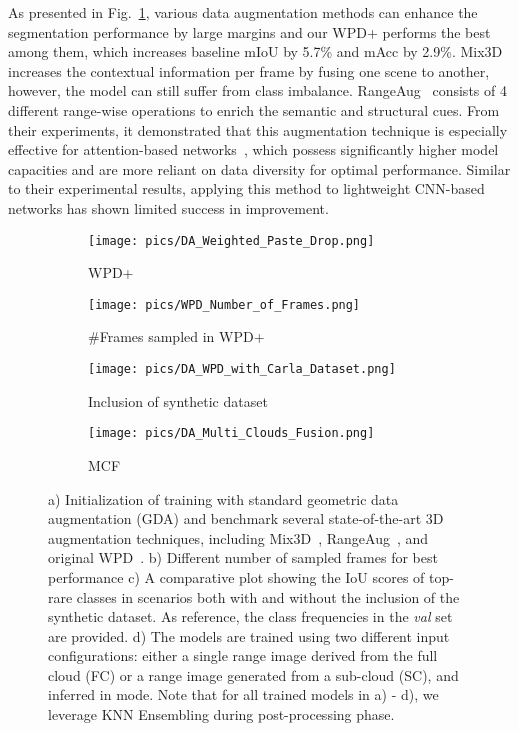  As presented in Fig.~\ref{fig:wpd+}, various data augmentation methods can enhance the segmentation performance by large margins and our WPD+ performs the best among them, which increases baseline mIoU by 5.7\% and mAcc by 2.9\%. Mix3D~\cite{nekrasov2021mix3d} increases the contextual information per frame by fusing one scene to another, however, the model can still suffer from class imbalance. RangeAug~\cite{kong2023rethinking} consists of 4 different range-wise operations to enrich the semantic and structural cues. From their experiments, it demonstrated that this augmentation technique is especially effective for attention-based networks~\cite{vaswani2017attention, dosovitskiy2020image}, which possess significantly higher model capacities and are more reliant on data diversity for optimal performance. Similar to their experimental results, applying this method to lightweight CNN-based networks has shown limited success in improvement.
\begin{figure*}[t]
\centering
\begin{subfigure}{.24\textwidth}
    \centering
    \texttt{[image: pics/DA\_Weighted\_Paste\_Drop.png]}
    \caption{WPD+}
    \label{fig:wpd+}
\end{subfigure}
\begin{subfigure}{.24\textwidth}
    \centering
    \texttt{[image: pics/WPD\_Number\_of\_Frames.png]}
    \caption{\#Frames sampled in WPD+}
    \label{fig:wpd+_frames}
\end{subfigure}
\begin{subfigure}{.24\textwidth}
    \centering
    \texttt{[image: pics/DA\_WPD\_with\_Carla\_Dataset.png]}
    \caption{Inclusion of synthetic dataset}
    \label{fig:wpd+_carla}
\end{subfigure}
\begin{subfigure}{.24\textwidth}
    \centering
    \texttt{[image: pics/DA\_Multi\_Clouds\_Fusion.png]} 
    \caption{MCF}
    \label{fig:mcf}
\end{subfigure}
\caption{a) Initialization of training with standard geometric data augmentation (GDA) and benchmark several state-of-the-art 3D augmentation techniques, including Mix3D~\cite{nekrasov2021mix3d}, RangeAug~\cite{kong2023rethinking}, and original WPD~\cite{gu2022maskrange}. b) Different number of sampled frames for best performance c) A comparative plot showing the IoU scores of top-rare classes in scenarios both with and without the inclusion of the synthetic dataset. As reference, the class frequencies in the \textit{val} set are provided. d) The models are trained using two different input configurations: either a single range image derived from the full cloud (FC) or a range image generated from a sub-cloud (SC), and inferred in \coolname{} mode. Note that for all trained models in a) - d), we leverage KNN Ensembling during post-processing phase.
}
\vspace{-5mm}
\label{fig:ablation_da}
\end{figure*}\\
